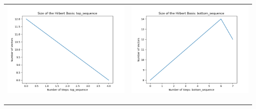 \documentclass[10pt]{article}
\begin{document}
\begin{tabular}{c|c}
\begin{minipage}{.45\textwidth}
\includegraphics[width=\textwidth]{"DATA/4d/4 generators 2 bound H/top_sequence SIZE"}
\end{minipage} &
\begin{minipage}{.45\textwidth}
\includegraphics[width=\textwidth]{"DATA/4d/4 generators 2 bound H bottomup/bottom_sequence SIZE"}
\end{minipage} \\ \\
\hline \\\begin{minipage}{.45\textwidth}

\end{minipage}
\end{tabular}
\end{document}
